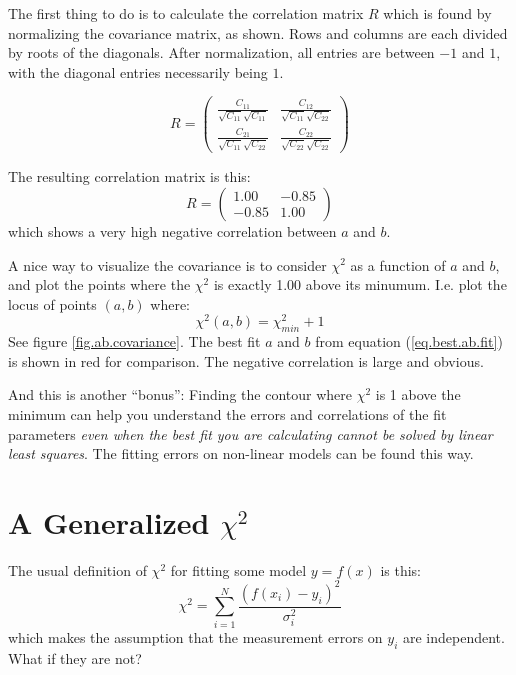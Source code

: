 \documentclass[letterpaper,12pt]{article}
\newcommand{\myMatrix}[1]{\bm{\mathit{#1}}}
\begin{document}
The first thing to do is to calculate the correlation matrix $\myMatrix{R}$ which is found by normalizing the covariance matrix, as shown. Rows and columns are each divided by roots of the diagonals. After normalization, all entries are between $-1$ and $1$, with the diagonal entries necessarily being $1$.

\begingroup
\renewcommand*{\arraystretch}{1.5}
\begin{equation}
\myMatrix{R}=
\begin{pmatrix}
\frac{C_{11}}{\sqrt{C_{11}}\sqrt{C_{11}}} & \frac{C_{12}}{\sqrt{C_{11}}\sqrt{C_{22}}} \\
\frac{C_{21}}{\sqrt{C_{11}}\sqrt{C_{22}}} & \frac{C_{22}}{\sqrt{C_{22}}\sqrt{C_{22}}} 

\end{pmatrix}
\end{equation}
\endgroup

The resulting correlation matrix is this:
\begin{equation}
\myMatrix{R}=
\begin{pmatrix}
1.00 & -0.85 \\
-0.85 & 1.00
\end{pmatrix}
\end{equation}
which shows a very high negative correlation between $a$ and $b$.

A nice way to visualize the covariance is to consider $\chi^2$ as a function of $a$ and $b$, and plot the points where the $\chi^2$ is exactly 1.00 above its minumum. I.e. plot the locus of points $(a,b)$ where:
\begin{equation}
\chi^2(a,b)=\chi^2_{min}+1
\end{equation}
See figure \ref{fig.ab.covariance}. The best fit $a$ and $b$ from equation (\ref{eq.best.ab.fit}) is shown in red for comparison. The negative correlation is large and obvious. 

And this is another ``bonus'': Finding the contour where $\chi^2$ is 1 above the minimum can help you understand the errors and correlations of the fit parameters \textit{even when the best fit you are calculating cannot be solved by linear least squares}. The fitting errors on non-linear models can be found this way.


\section{A Generalized $\chi^2$}
The usual definition of $\chi^2$ for fitting some model $y=f(x)$ is this:
\begin{equation}
\chi^2=\sum_{i=1}^N \frac{(f(x_i) - y_i)^2}{\sigma_i^2}
\end{equation}
which makes the assumption that the measurement errors on $y_i$ are independent. What if they are not?
\end{document}
